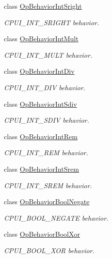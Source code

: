 \begin{DoxyCompactItemize}
class \mbox{\hyperlink{class_op_behavior_int_sright}{Op\+Behavior\+Int\+Sright}}
\begin{DoxyCompactList}\small\item\em C\+P\+U\+I\+\_\+\+I\+N\+T\+\_\+\+S\+R\+I\+G\+HT behavior. \end{DoxyCompactList}\item 
class \mbox{\hyperlink{class_op_behavior_int_mult}{Op\+Behavior\+Int\+Mult}}
\begin{DoxyCompactList}\small\item\em C\+P\+U\+I\+\_\+\+I\+N\+T\+\_\+\+M\+U\+LT behavior. \end{DoxyCompactList}\item 
class \mbox{\hyperlink{class_op_behavior_int_div}{Op\+Behavior\+Int\+Div}}
\begin{DoxyCompactList}\small\item\em C\+P\+U\+I\+\_\+\+I\+N\+T\+\_\+\+D\+IV behavior. \end{DoxyCompactList}\item 
class \mbox{\hyperlink{class_op_behavior_int_sdiv}{Op\+Behavior\+Int\+Sdiv}}
\begin{DoxyCompactList}\small\item\em C\+P\+U\+I\+\_\+\+I\+N\+T\+\_\+\+S\+D\+IV behavior. \end{DoxyCompactList}\item 
class \mbox{\hyperlink{class_op_behavior_int_rem}{Op\+Behavior\+Int\+Rem}}
\begin{DoxyCompactList}\small\item\em C\+P\+U\+I\+\_\+\+I\+N\+T\+\_\+\+R\+EM behavior. \end{DoxyCompactList}\item 
class \mbox{\hyperlink{class_op_behavior_int_srem}{Op\+Behavior\+Int\+Srem}}
\begin{DoxyCompactList}\small\item\em C\+P\+U\+I\+\_\+\+I\+N\+T\+\_\+\+S\+R\+EM behavior. \end{DoxyCompactList}\item 
class \mbox{\hyperlink{class_op_behavior_bool_negate}{Op\+Behavior\+Bool\+Negate}}
\begin{DoxyCompactList}\small\item\em C\+P\+U\+I\+\_\+\+B\+O\+O\+L\+\_\+\+N\+E\+G\+A\+TE behavior. \end{DoxyCompactList}\item 
class \mbox{\hyperlink{class_op_behavior_bool_xor}{Op\+Behavior\+Bool\+Xor}}
\begin{DoxyCompactList}\small\item\em C\+P\+U\+I\+\_\+\+B\+O\+O\+L\+\_\+\+X\+OR behavior. \end{DoxyCompactList}\item 

\end{DoxyCompactItemize}
